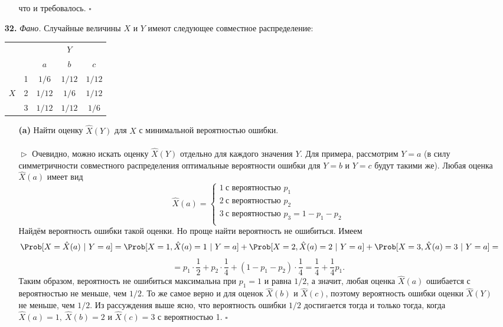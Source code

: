 \documentclass{article}
\begin{document}
\begin{enumerate}
\begin{enumerate}
что и требовалось. $\square$
\\
\end{enumerate}
\item[\bfseries 32.] \textit{Фано.} Случайные величины $X$ и $Y$ имеют следующее совместное распределение:
\begin{center}
\begin{tabular}{ c c | c c c}
& & & $Y$ & \\
& & $a$ & $b$ & $c$\\ \hline
& 1 & $1/6$ & $1/12$ & $1/12$ \\
$X$ & 2& $1/12$ & $1/6$ & $1/12$\\
& 3 & $1/12$ & $1/12$ & $1/6$\\
\end{tabular}
\end{center}
\begin{enumerate}
\item[\bfseries (a)] Найти оценку $\hat X(Y)$ для $X$ с минимальной вероятностью ошибки.
\\\\$\vartriangleright$ Очевидно, можно искать оценку $\hat X(Y)$ отдельно для каждого значения $Y$. Для примера, рассмотрим $Y = a$ (в силу симметричности совместного распределения оптимальные вероятности ошибки для $Y = b$ и $Y = c$ будут такими же). Любая оценка $\hat X(a)$ имеет вид 
$$\hat X(a) = 
\begin{cases}
1\ \text{с вероятностью } p_1\\
2\ \text{с вероятностью } p_2\\
3\ \text{с вероятностью } p_3 = 1 - p_1 - p_2\\
\end{cases}$$
Найдём вероятность ошибки такой оценки. Но проще найти вероятность не ошибиться. Имеем 
$$\Prob[X = \hat X(a)\ |\ Y = a] = \Prob[X = 1, \hat X(a) = 1\ |\ Y = a] + \Prob[X = 2, \hat X(a) = 2\ |\ Y = a] + \Prob[X = 3, \hat X(a) = 3\ |\ Y = a] =$$
$$= p_1 \cdot \frac{1}{2} + p_2 \cdot \frac{1}{4} + (1 - p_1 - p_2) \cdot \frac{1}{4} = \frac{1}{4} + \frac{1}{4}p_1.$$
Таким образом, вероятность не ошибиться максимальна при $p_1 = 1$ и равна $1/2$, а значит, любая оценка $\hat X(a)$ ошибается с вероятностью не меньше, чем $1/2$. То же самое верно и для оценок $\hat X(b)$ и $\hat X(c)$, поэтому вероятность ошибки оценки $\hat X(Y)$ не меньше, чем $1/2.$ Из рассуждения выше ясно, что вероятность ошибки $1/2$ достигается тогда и только тогда, когда $\hat X(a) = 1,\ \hat X(b) = 2$ и $\hat X(c) = 3$ с вероятностью 1. $\square$
\\\\

\end{enumerate}
\end{enumerate}
\end{document}

